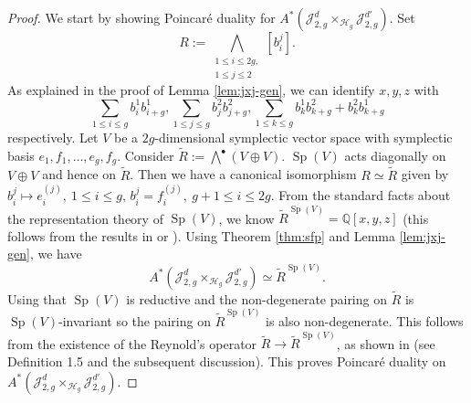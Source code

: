 \documentclass[11pt]{amsart}
\theoremstyle{definition}
\newcommand{\jac}{\mathcal{J}}
\newcommand{\h}{\mathcal{H}}
\begin{document}
\begin{proof}
We start by showing Poincar\'e duality for $A^*(\jac^d_{2,g}\times_{\h_g}\jac^{d'}_{2,g})$. Set 
$$R:= \underset{\substack{1\leq i\leq 2g,\\1\leq j\leq 2}}{\bigwedge} [b^j_i].$$
 As explained in the proof of Lemma \ref{lem:jxj-gen}, 
we can identify $x,y,z$ with $$\sum_{1\leq i\leq g} b^1_ib^1_{i+g}, \sum_{1\leq j\leq g} b^2_jb^2_{j+g}, \sum_{1\leq k\leq g} b^1_kb^2_{k+g}+b^2_kb^1_{k+g}$$ respectively.
Let $V$ be a $2g$-dimensional symplectic vector space with symplectic basis $e_1,f_1,\dots, e_g,f_g$. Consider $\tilde R:= \bigwedge^\bullet (V\oplus V)$. $\operatorname{Sp}(V)$ acts diagonally on $V\oplus V$ and hence on $\tilde R$. Then we have a canonical isomorphism $R\simeq \tilde R$ given by $b^j_i \mapsto e^{(j)}_{i}, \ 1\leq i\leq g $, $b^j_i =f^{(j)}_i, \ g+1\leq i\leq 2g $. From the standard facts about the representation theory of $\operatorname{Sp}(V)$, we know $\tilde R^{\operatorname{Sp}(V)} = \mathbb Q[ x,y,z ]$ (this follows from the results in \cite[Chapter VI]{MR1488158} or \cite[Theorem 2]{MR986027}). Using Theorem \ref{thm:sfp} and Lemma \ref{lem:jxj-gen}, we have
$$A^* (\mathcal J^d_{2,g} \times_{\mathcal H_g} \mathcal J^{d'}_{2,g}) \simeq \tilde R^{\operatorname{Sp}(V)}.$$ Using that $\operatorname{Sp}(V)$ is reductive and the non-degenerate pairing on $\tilde R$ is $\operatorname{Sp}(V)$-invariant so the pairing on $\tilde R^{\operatorname{Sp}(V)}$ is also non-degenerate. This follows from the existence of the Reynold's operator $\tilde R\rightarrow \tilde R^{\operatorname{Sp}(V)}$, as shown in \cite{MR719371} (see Definition 1.5 and the subsequent discussion). This proves Poincar\'e duality on $A^* (\mathcal J^d_{2,g} \times_{\mathcal H_g} \mathcal J^{d'}_{2,g})$. 


\end{proof}
\end{document}
